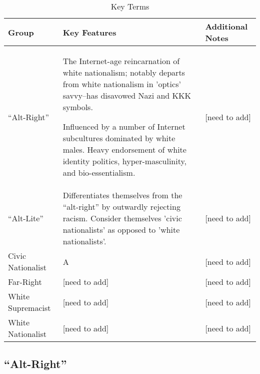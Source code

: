 \documentclass[acmlarge, screen, authorversion]{acmart}
\begin{document}
\begin{table*}

	\caption{Key Terms}
	\label{table:key-terms}

	\begin{tabular}{ p{2cm}  p{6cm}  p{4cm} }

		\toprule
		Group             & Key Features                                                                                                                                                 & Additional Notes \\
		\midrule
		``Alt-Right'' & The Internet-age reincarnation of white nationalism; notably departs from white nationalism in 'optics' savvy--has disavowed Nazi and KKK symbols.

		Influenced by a number of Internet subcultures dominated by white males. Heavy endorsement of white identity politics, hyper-masculinity, and bio-essentialism.  & [need to add] \\
		\hline
		``Alt-Lite''      & Differentiates themselves from the ``alt-right'' by outwardly rejecting racism. Consider themselves 'civic nationalists' as opposed to 'white nationalists'. & [need to add]    \\
		\hline
		Civic Nationalist & A                                                                                                                                                            & [need to add]    \\
		\hline
		Far-Right         & [need to add]                                                                                                                                                & [need to add]    \\
		\hline
		White Supremacist & [need to add]                                                                                                                                                & [need to add]    \\
		\hline
		White Nationalist & [need to add]                                                                                                                                                & [need to add]    \\
		\bottomrule
	\end{tabular}
\end{table*}

\subsection{``Alt-Right''}
\end{document}
